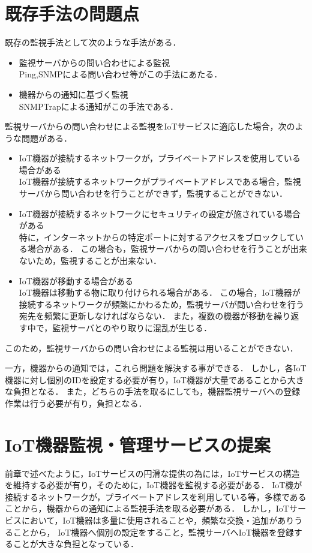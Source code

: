 \section{既存手法の問題点}
既存の監視手法として次のような手法がある．
\begin{itemize}
\item 監視サーバからの問い合わせによる監視\\
	Ping,SNMPによる問い合わせ等がこの手法にあたる．
\item 機器からの通知に基づく監視\\
	SNMPTrapによる通知がこの手法である．
\end{itemize}
\medskip

監視サーバからの問い合わせによる監視をIoTサービスに適応した場合，次のような問題がある．
\begin{itemize}
\item IoT機器が接続するネットワークが，プライベートアドレスを使用している場合がある\\
	IoT機器が接続するネットワークがプライベートアドレスである場合，監視サーバから問い合わせを行うことができず，監視することができない．
\item IoT機器が接続するネットワークにセキュリティの設定が施されている場合がある\\
	特に，インターネットからの特定ポートに対するアクセスをブロックしている場合がある．
	この場合も，監視サーバからの問い合わせを行うことが出来ないため，監視することが出来ない．
\item IoT機器が移動する場合がある\\
	IoT機器は移動する物に取り付けられる場合がある．
	この場合，IoT機器が接続するネットワークが頻繁にかわるため，監視サーバが問い合わせを行う宛先を頻繁に更新しなければならない．
	また，複数の機器が移動を繰り返す中で，監視サーバとのやり取りに混乱が生じる．
\end{itemize}
このため，監視サーバからの問い合わせによる監視は用いることができない．
\medskip

一方，機器からの通知では，これら問題を解決する事ができる．
しかし，各IoT機器に対し個別のIDを設定する必要が有り，IoT機器が大量であることから大きな負担となる．
また，どちらの手法を取るにしても，機器監視サーバへの登録作業は行う必要が有り，負担となる．

\section{IoT機器監視・管理サービスの提案}
前章で述べたように，IoTサービスの円滑な提供の為には，IoTサービスの構造を維持する必要が有り，そのために，IoT機器を監視する必要がある．
IoT機が接続するネットワークが，プライベートアドレスを利用している等，多様であることから，機器からの通知による監視手法を取る必要がある．
しかし，IoTサービスにおいて，IoT機器は多量に使用されることや，頻繁な交換・追加がありうることから，
IoT機器へ個別の設定をすること，監視サーバへIoT機器を登録することが大きな負担となっている．
\medskip

